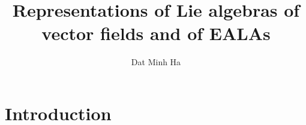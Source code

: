 

\setcounter{section}{-1}





    \title{Representations of Lie algebras of vector fields and of EALAs}
    
    \author{Dat Minh Ha}
    \maketitle
    
    \begin{abstract}
    
    \end{abstract}
    
    {
    \hypersetup{} 
    \tableofcontents %
    }

    \section{Introduction}

    
    
    \printbibliography

